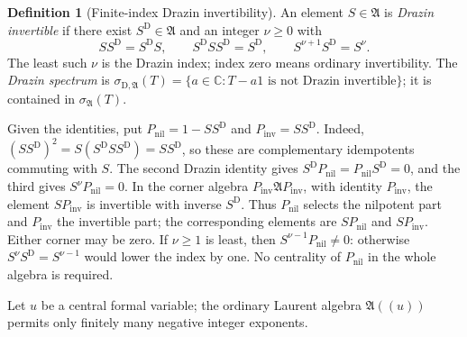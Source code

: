 \documentclass[11pt,a4paper]{article}
\numberwithin{equation}{section}
\theoremstyle{definition}
\newtheorem{definition}[definition]{Definition}
\theoremstyle{remark}
\newcommand{\C}{\mathbb C}
\newcommand{\Alg}{\mathfrak A}
\newcommand{\sigD}{\sigma_{\mathrm D,\Alg}}
\begin{document}
\begin{definition}[Finite-index Drazin invertibility]\label{ihs:dz:def:drazin}
An element $S\in\Alg$ is \emph{Drazin invertible} if there exist
$S^{\mathrm D}\in\Alg$ and an integer $\nu\ge0$ with
\begin{equation}\label{ihs:dz:eq:drazin}
 SS^{\mathrm D}=S^{\mathrm D}S,\qquad
 S^{\mathrm D}SS^{\mathrm D}=S^{\mathrm D},\qquad
 S^{\nu+1}S^{\mathrm D}=S^\nu.
\end{equation}
The least such $\nu$ is the Drazin index; index zero means ordinary
invertibility. The \emph{Drazin spectrum} is
$\sigD(T)=\{a\in\C:T-a1\text{ is not Drazin invertible}\}$; it is contained
in $\sigma_\Alg(T)$.
\end{definition}

Given the identities, put $P_{\mathrm{nil}}=1-SS^{\mathrm D}$ and
$P_{\mathrm{inv}}=SS^{\mathrm D}$. Indeed,
$(SS^{\mathrm D})^2=S(S^{\mathrm D}SS^{\mathrm D})=SS^{\mathrm D}$, so these
are complementary idempotents commuting with $S$. The second Drazin identity
gives $S^{\mathrm D}P_{\mathrm{nil}}=P_{\mathrm{nil}}S^{\mathrm D}=0$, and
the third gives $S^\nu P_{\mathrm{nil}}=0$. In the corner algebra
$P_{\mathrm{inv}}\Alg P_{\mathrm{inv}}$, with identity $P_{\mathrm{inv}}$,
the element $SP_{\mathrm{inv}}$ is invertible with inverse $S^{\mathrm D}$.
Thus $P_{\mathrm{nil}}$ selects the nilpotent part and $P_{\mathrm{inv}}$ the
invertible part; the corresponding elements are $SP_{\mathrm{nil}}$ and
$SP_{\mathrm{inv}}$. Either corner may be zero. If $\nu\ge1$ is least,
then $S^{\nu-1}P_{\mathrm{nil}}\ne0$: otherwise
$S^\nu S^{\mathrm D}=S^{\nu-1}$ would lower the index by one.
No centrality of $P_{\mathrm{nil}}$ in the whole algebra is required.

Let $u$ be a central formal variable; the ordinary Laurent algebra $\Alg((u))$
permits only finitely many negative integer exponents.
\end{document}
